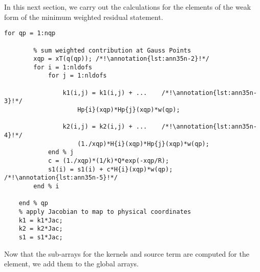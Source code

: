 In this next section, we carry out the calculations for the elements of the weak form of the minimum weighted residual statement.

\begin{lstlisting}[style=myMatlab,name=lec35n-ex]
    for qp = 1:nqp
        
        % sum weighted contribution at Gauss Points
        xqp = xT(q(qp)); /*!\annotation{lst:ann35n-2}!*/
        for i = 1:nldofs
            for j = 1:nldofs
                
                k1(i,j) = k1(i,j) + ...    /*!\annotation{lst:ann35n-3}!*/
                    Hp{i}(xqp)*Hp{j}(xqp)*w(qp);
                                
                k2(i,j) = k2(i,j) + ...    /*!\annotation{lst:ann35n-4}!*/
                    (1./xqp)*H{i}(xqp)*Hp{j}(xqp)*w(qp);
            end % j
            c = (1./xqp)*(1/k)*Q*exp(-xqp/R);
            s1(i) = s1(i) + c*H{i}(xqp)*w(qp);  /*!\annotation{lst:ann35n-5}!*/
        end % i
     
    end % qp
    % apply Jacobian to map to physical coordinates
    k1 = k1*Jac;
    k2 = k2*Jac;
    s1 = s1*Jac;

\end{lstlisting}
Now that the sub-arrays for the kernels and source term are computed for the element, we add them to the global arrays.

